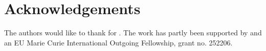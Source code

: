 \section{Acknowledgements}

The authors would like to thank  for . The work has partly been supported by  and an EU Marie Curie International Outgoing Fellowship, grant no. 252206. 
